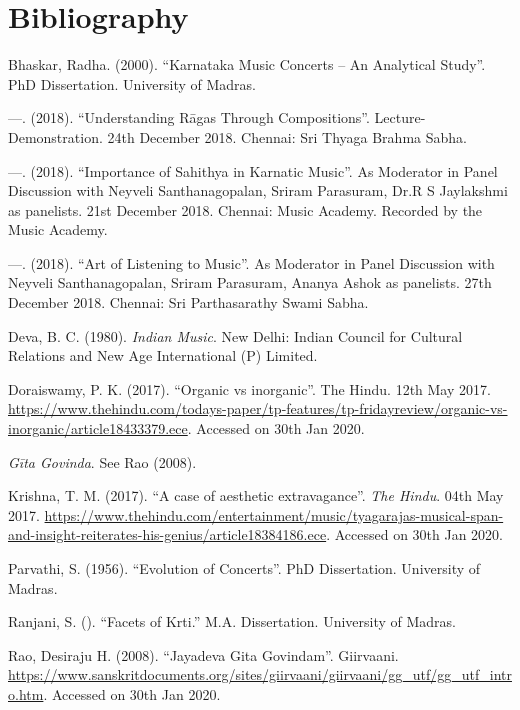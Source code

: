 \section*{Bibliography}

\begin{thebibliography}{99}
\itemsep=0pt
 Bhaskar, Radha. (2000). “Karnataka Music Concerts – An Analytical Study”. PhD Dissertation. University of Madras.

  —. (2018). “Understanding Rāgas Through Compositions”. Lecture-Demonstration. 24th December 2018. Chennai: Sri Thyaga Brahma Sabha.

  —. (2018). “Importance of Sahithya in Karnatic Music”. As Moderator in Panel Discussion with Neyveli Santhanagopalan, Sriram Parasuram, Dr.R S Jaylakshmi as panelists. 21st December 2018. Chennai: Music Academy. Recorded by the Music Academy.

  —. (2018). “Art of Listening to Music”. As Moderator in Panel Discussion with Neyveli Santhanagopalan, Sriram Parasuram, Ananya Ashok as panelists. 27th December 2018. Chennai: Sri Parthasarathy Swami Sabha.

  Deva, B. C. (1980). \textit{Indian Music}. New Delhi: Indian Council for Cultural Relations and New Age International (P) Limited.

  Doraiswamy, P. K. (2017). “Organic vs inorganic”. The Hindu. 12th May 2017. \url{https://www.thehindu.com/todays-paper/tp-features/tp-fridayreview/organic-vs-inorganic/article18433379.ece}. Accessed on 30th Jan 2020.

  \textit{Gīta Govinda}. See Rao (2008).

  Krishna, T. M. (2017). “A case of aesthetic extravagance”. \textit{The Hindu}. 04th May 2017. \url{https://www.thehindu.com/entertainment/music/tyagarajas-musical-span-and-insight-reiterates-his-genius/article18384186.ece}. Accessed on 30th Jan 2020.

  Parvathi, S. (1956). “Evolution of Concerts”. PhD Dissertation. University of Madras.

  Ranjani, S. (). “Facets of Krti.” M.A. Dissertation. University of Madras.

  Rao, Desiraju H. (2008). “Jayadeva Gita Govindam”. Giirvaani. \url{https://www.sanskritdocuments.org/sites/giirvaani/giirvaani/gg_utf/gg_utf_intro.htm}. Accessed on 30th Jan 2020.


\end{thebibliography}
